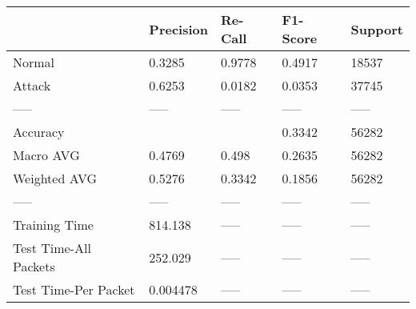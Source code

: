 \begin{tabular}{lllll}
\toprule
{} & Precision & Re-Call & F1-Score & Support \\
\midrule
Normal                &    0.3285 &  0.9778 &   0.4917 &   18537 \\
Attack                &    0.6253 &  0.0182 &   0.0353 &   37745 \\
-----                 &     ----- &   ----- &    ----- &   ----- \\
Accuracy              &           &         &   0.3342 &   56282 \\
Macro AVG             &    0.4769 &   0.498 &   0.2635 &   56282 \\
Weighted AVG          &    0.5276 &  0.3342 &   0.1856 &   56282 \\
-----                 &     ----- &   ----- &    ----- &   ----- \\
Training Time         &   814.138 &   ----- &    ----- &   ----- \\
Test Time-All Packets &   252.029 &   ----- &    ----- &   ----- \\
Test Time-Per Packet  &  0.004478 &   ----- &    ----- &   ----- \\
\bottomrule
\end{tabular}
